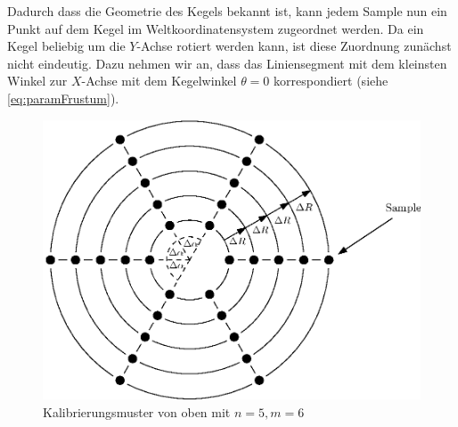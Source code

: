 Dadurch dass die Geometrie des Kegels bekannt ist, kann jedem Sample nun ein Punkt auf dem Kegel im Weltkoordinatensystem zugeordnet werden. Da ein Kegel beliebig um die $Y$-Achse rotiert werden kann, ist diese Zuordnung zunächst nicht eindeutig. Dazu nehmen wir an, dass das Liniensegment mit dem kleinsten Winkel zur $X$-Achse mit dem Kegelwinkel $\theta = 0$ korrespondiert (siehe \ref{eq:paramFrustum}).

\begin{figure}[!htb]
	\centering
	\includegraphics[scale=.8]{images/calibrationPatternTop.eps}
	\caption{Kalibrierungsmuster von oben mit $n = 5, m = 6$}
	\label{fig:calibrationPatternTop}
\end{figure}


